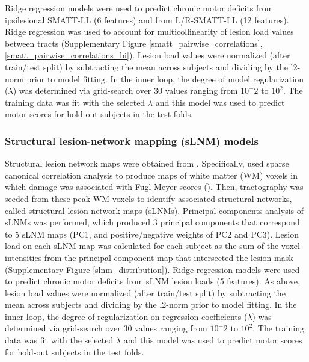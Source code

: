 \documentclass[10pt]{article}
\begin{document}
Ridge regression models were used to predict chronic motor deficits from ipsilesional SMATT-LL (6 features) and from L/R-SMATT-LL (12 features). Ridge regression was used to account for multicollinearity of lesion load values between tracts (Supplementary Figure \ref{smatt_pairwise_correlations}, \ref{smatt_pairwise_correlations_bi}). Lesion load values were normalized (after train/test split) by subtracting the mean across subjects and dividing by the l2-norm prior to model fitting. In the inner loop, the degree of model regularization  ($\lambda$) was determined via grid-search over 30 values ranging from $10^-2$ to $10^2$. The training data was fit with the selected $\lambda$ and this model was used to predict motor scores for hold-out subjects in the test folds.

\subsubsection*{Structural lesion-network mapping (sLNM) models}
Structural lesion network maps were obtained from \cite{Bowren2022-rs}. Specifically, \cite{Bowren2022-rs} used sparse canonical correlation analysis to produce maps of white matter (WM) voxels in which damage was associated with Fugl-Meyer scores (\cite{Pustina2018-xv}). Then, tractography was seeded from these peak WM voxels to identify associated structural networks, called structural lesion network maps (sLNMs). Principal components analysis of sLNMs was performed, which produced 3 principal components that correspond to 5 sLNM maps (PC1, and positive/negative weights of PC2 and PC3). Lesion load on each sLNM map was calculated for each subject as the sum of the voxel intensities from the principal component map that intersected the lesion mask (Supplementary Figure \ref{slnm_distribution}). Ridge regression models were used to predict chronic motor deficits from sLNM lesion loads (5 features). As above, lesion load values were normalized (after train/test split) by subtracting the mean across subjects and dividing by the l2-norm prior to model fitting. In the inner loop, the degree of regularization on regression coefficients ($\lambda$) was determined via grid-search over 30 values ranging from $10^-2$ to $10^2$. The training data was fit with the selected $\lambda$ and this model was used to predict motor scores for hold-out subjects in the test folds. 
\end{document}

